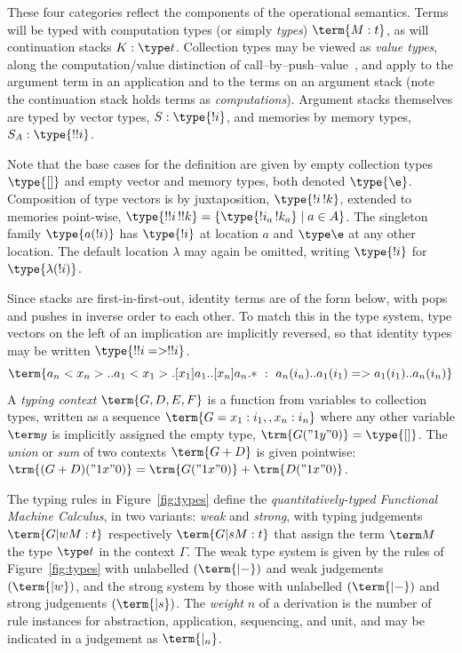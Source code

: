 \documentclass[a4paper,UKenglish,cleveref, autoref, thm-restate]{lipics-v2021}
\newcommand\defn\emph
\begin{document}
These four categories reflect the components of the operational semantics. Terms will be typed with computation types (or simply \emph{types}) $\term{M:t}$, as will continuation stacks $K:\type t$. Collection types may be viewed as \emph{value types}, along the computation/value distinction of call--by--push--value~\cite{Levy-2003}, and apply to the argument term in an application and to the terms on an argument stack (note the continuation stack holds terms as \emph{computations}). Argument stacks themselves are typed by vector types, $S:\type{!i}$, and memories by memory types, $S_A:\type{!!i}$.

Note that the base cases for the definition are given by empty collection types $\type{[]}$ and empty vector and memory types, both denoted $\type{\e}$. Composition of type vectors is by juxtaposition, $\type{!i\,!k}$, extended to memories point-wise, $\type{!!i\,!!k}=\{\type{!i_a\,!k_a}\mid a\in A\}$. The singleton family $\type{a(!i)}$ has $\type{!i}$ at location $a$ and $\type\e$ at any other location. The default location $\lambda$ may again be omitted, writing $\type{!i}$ for $\type{\lambda(!i)}$.

Since stacks are first-in-first-out, identity terms are of the form below, with pops and pushes in inverse order to each other. To match this in the type system, type vectors on the left of an implication are implicitly reversed, so that identity types may be written $\type{!!i => !!i}$.
\[
	\term{a_n<x_n>..a_1<x_1>.[x_1]a_1..[x_n]a_n.*~:~a_n(i_n)..a_1(i_1) => a_1(i_1)..a_n(i_n)}
\] 
A \emph{typing context} $\term{G,D,E,F}$ is a function from variables to collection types, written as a sequence $\term{G = x_1:i_1,,x_n:i_n}$ where any other variable $\term y$ is implicitly assigned the empty type, $\trm{G("1y"0)}=\type{[]}$. The \emph{union} or \emph{sum} of two contexts $\term{G+D}$ is given pointwise: $\trm{(G+D)("1x"0)}=\trm{G("1x"0)}+\trm{D("1x"0)}$.

\begin{definition}
The typing rules in Figure~\ref{fig:types} define the \defn{quantitatively-typed Functional Machine Calculus}, in two variants: \emph{weak} and \emph{strong}, with typing judgements $\term{G |w M:t}$ respectively $\term{G |s M:t}$ that assign the term $\term M$ the type $\type t$ in the context $\Gamma$. The weak type system is given by the rules of Figure~\ref{fig:types} with unlabelled $(\term{|-})$ and weak judgements $(\term{|w})$, and the strong system  by those with unlabelled $(\term{|-})$ and strong judgements $(\term{|s})$. The \emph{weight} $n$ of a derivation is the number of rule instances for abstraction, application, sequencing, and unit, and may be indicated in a judgement as $\term{|_n}$.
\end{definition}
\end{document}
